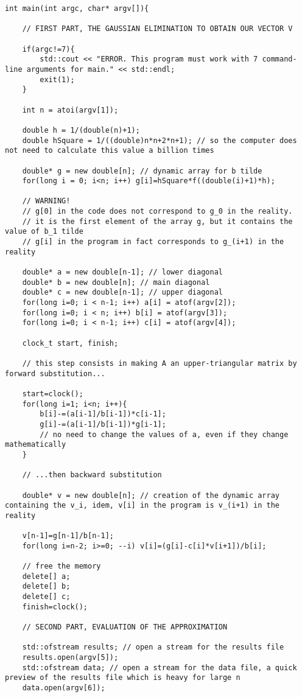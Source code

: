 \documentclass[a4paper, twoside, 11pt]{report}
\theoremstyle{theorem}
\theoremstyle{remark}
\theoremstyle{exemple}
\begin{document}
		\begin{lstlisting}
int main(int argc, char* argv[]){

    // FIRST PART, THE GAUSSIAN ELIMINATION TO OBTAIN OUR VECTOR V

    if(argc!=7){
        std::cout << "ERROR. This program must work with 7 command-line arguments for main." << std::endl;
        exit(1);
    }

    int n = atoi(argv[1]);

    double h = 1/(double(n)+1);
    double hSquare = 1/((double)n*n+2*n+1); // so the computer does not need to calculate this value a billion times

    double* g = new double[n]; // dynamic array for b tilde
    for(long i = 0; i<n; i++) g[i]=hSquare*f((double(i)+1)*h);

    // WARNING!
    // g[0] in the code does not correspond to g_0 in the reality.
    // it is the first element of the array g, but it contains the value of b_1 tilde
    // g[i] in the program in fact corresponds to g_(i+1) in the reality

    double* a = new double[n-1]; // lower diagonal
    double* b = new double[n]; // main diagonal
    double* c = new double[n-1]; // upper diagonal
    for(long i=0; i < n-1; i++) a[i] = atof(argv[2]);
    for(long i=0; i < n; i++) b[i] = atof(argv[3]);
    for(long i=0; i < n-1; i++) c[i] = atof(argv[4]);

    clock_t start, finish;

    // this step consists in making A an upper-triangular matrix by forward substitution...

    start=clock();
    for(long i=1; i<n; i++){
        b[i]-=(a[i-1]/b[i-1])*c[i-1];
        g[i]-=(a[i-1]/b[i-1])*g[i-1];
        // no need to change the values of a, even if they change mathematically
    }

    // ...then backward substitution

    double* v = new double[n]; // creation of the dynamic array containing the v_i, idem, v[i] in the program is v_(i+1) in the reality

    v[n-1]=g[n-1]/b[n-1];
    for(long i=n-2; i>=0; --i) v[i]=(g[i]-c[i]*v[i+1])/b[i];

    // free the memory
    delete[] a;
    delete[] b;
    delete[] c;
    finish=clock();

    // SECOND PART, EVALUATION OF THE APPROXIMATION

    std::ofstream results; // open a stream for the results file
    results.open(argv[5]);
    std::ofstream data; // open a stream for the data file, a quick preview of the results file which is heavy for large n
    data.open(argv[6]);


\end{lstlisting}
\end{document}
